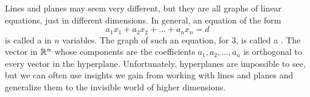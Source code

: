 \documentclass{ximera}
\begin{document}
 
Lines and planes may seem very different, but they are all graphs of linear equations, just in different dimensions.  In general, an equation of the form
$$a_1x_1+a_2x_2+\dots +a_nx_n=d$$
is called a  in $n$ variables.  The graph of such an equation, for $3$, is called a .  The vector in $\mathbb{R}^n$ whose components are the coefficients $a_1, a_2, \dots ,a_n$ is orthogonal to every vector in the hyperplane.  Unfortunately, hyperplanes are impossible to see, but we can often use insights we gain from working with lines and planes and generalize them to the invisible world of higher dimensions.
\end{document}
